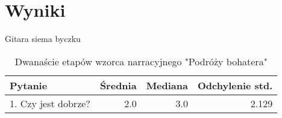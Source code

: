 \chapter{Wyniki}\label{chapter:ch7}

Gitara siema byczku

\begin{table}[h!]
    \begin{center}
        \begin{tabular}{|l|r|r|r|}
            \hline
            Pytanie             & Średnia & Mediana & Odchylenie std. \\
            \hline
            1. Czy jest dobrze? & 2.0     & 3.0     & 2.129           \\
            \hline
        \end{tabular}
    \end{center}
    \caption{Dwanaście etapów wzorca narracyjnego "Podróży bohatera" \cite{narrative_structures}}\label{tab1:ch7_1}
\end{table}